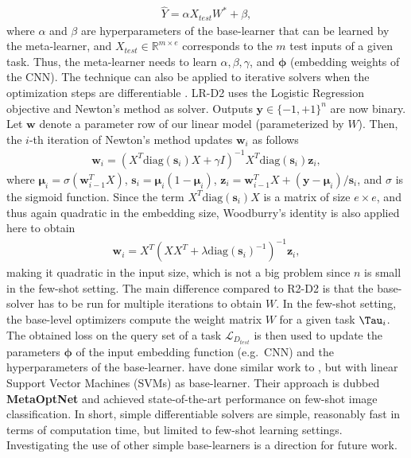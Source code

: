 \begin{align}
    \hat{Y} = \alpha X_{test}W^{*} + \beta,
\end{align} where $\alpha$ and $\beta$ are hyperparameters of the base-learner that can be learned by the meta-learner, and $X_{test} \in \mathbb{R}^{m \times e}$ corresponds to the $m$ test inputs of a given task. Thus, the meta-learner needs to learn $\alpha, \beta, \gamma$, and $\boldsymbol{\phi}$ (embedding weights of the CNN).  
The technique can also be applied to iterative solvers when the optimization steps are differentiable . LR-D2 uses the Logistic Regression objective and Newton's method as solver. Outputs $\boldsymbol{y} \in \{-1,+1\}^{n}$ are now binary. Let $\boldsymbol{w}$ denote a parameter row of our linear model (parameterized by $W$). Then, the $i$-th iteration of Newton's method updates $\boldsymbol{w}_{i}$ as follows
\begin{align}
    \boldsymbol{w}_{i} = (X^{T}\mbox{diag}(\boldsymbol{s}_{i})X + \gamma I)^{-1}X^{T}\mbox{diag}(\boldsymbol{s}_{i})\boldsymbol{z}_{i}, 
\end{align} where $\boldsymbol{\mu}_{i} = \sigma(\boldsymbol{w}^{T}_{i-1}X)$, $\boldsymbol{s}_{i} = \boldsymbol{\mu}_{i}(1 - \boldsymbol{\mu}_{i})$, $\boldsymbol{z}_{i} = \boldsymbol{w}^{T}_{i-1}X + (\boldsymbol{y} - \boldsymbol{\mu}_{i})/\boldsymbol{s}_{i}$, and $\sigma$ is the sigmoid function. Since the term $X^{T}\mbox{diag}(\boldsymbol{s}_{i})X$ is a matrix of size $e \times e$, and thus again quadratic in the embedding size, Woodburry's identity is also applied here to obtain
\begin{align}
    \boldsymbol{w}_{i} = X^{T}(XX^{T} + \lambda \mbox{diag}(\boldsymbol{s}_{i})^{-1})^{-1}\boldsymbol{z}_{i},
\end{align} making it quadratic in the input size, which is not a big problem since $n$ is small in the few-shot setting. The main difference compared to R2-D2 is that the base-solver has to be run for multiple iterations to obtain $W$.
In the few-shot setting, the base-level optimizers compute the weight matrix $W$ for a given task $\Tau_{i}$. The obtained loss on the query set of a task $\mathcal{L}_{D_{test}}$ is then used to update the parameters $\boldsymbol{\phi}$ of the input embedding function (e.g.\ CNN) and the hyperparameters of the base-learner.
 have done similar work to , but with linear Support Vector Machines (SVMs) as base-learner. Their approach is dubbed \textbf{MetaOptNet} and achieved state-of-the-art performance on few-shot image classification. 
In short, simple differentiable solvers are simple, reasonably fast in terms of computation time, but limited to few-shot learning settings. Investigating the use of other simple base-learners is a direction for future work.

